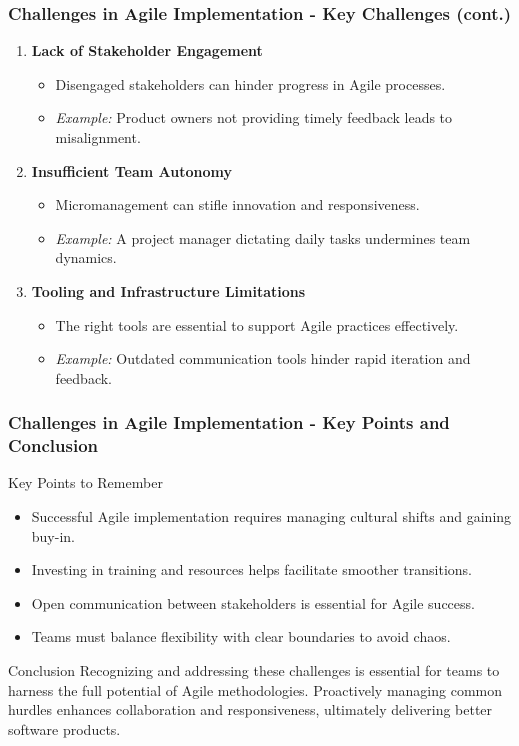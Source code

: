\documentclass{beamer}
\begin{document}
\begin{frame}[fragile]
    \frametitle{Challenges in Agile Implementation - Key Challenges (cont.)}
    \begin{enumerate}[resume]
        \item \textbf{Lack of Stakeholder Engagement}
        \begin{itemize}
            \item Disengaged stakeholders can hinder progress in Agile processes.
            \item \textit{Example:} Product owners not providing timely feedback leads to misalignment.
        \end{itemize}

        \item \textbf{Insufficient Team Autonomy}
        \begin{itemize}
            \item Micromanagement can stifle innovation and responsiveness.
            \item \textit{Example:} A project manager dictating daily tasks undermines team dynamics.
        \end{itemize}

        \item \textbf{Tooling and Infrastructure Limitations}
        \begin{itemize}
            \item The right tools are essential to support Agile practices effectively.
            \item \textit{Example:} Outdated communication tools hinder rapid iteration and feedback.
        \end{itemize}
    \end{enumerate}
\end{frame}

\begin{frame}[fragile]
    \frametitle{Challenges in Agile Implementation - Key Points and Conclusion}
    \begin{block}{Key Points to Remember}
        \begin{itemize}
            \item Successful Agile implementation requires managing cultural shifts and gaining buy-in.
            \item Investing in training and resources helps facilitate smoother transitions.
            \item Open communication between stakeholders is essential for Agile success.
            \item Teams must balance flexibility with clear boundaries to avoid chaos.
        \end{itemize}
    \end{block}
    
    \begin{block}{Conclusion}
        Recognizing and addressing these challenges is essential for teams to harness the full potential of Agile methodologies. Proactively managing common hurdles enhances collaboration and responsiveness, ultimately delivering better software products.
    \end{block}
\end{frame}
\end{document}
